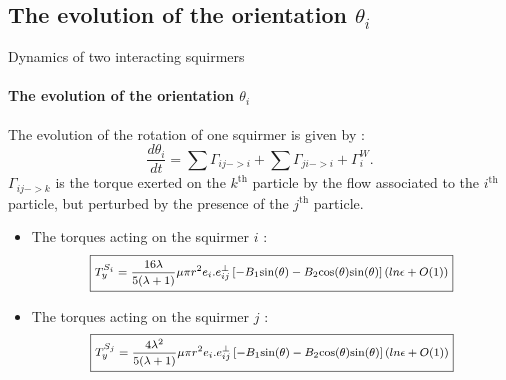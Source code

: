 \documentclass{beamer}
\begin{document}
\subsection{The evolution of the orientation $\theta _i$}
\begin{frame}{Dynamics of two interacting squirmers}
        \framesubtitle{The evolution of the orientation $\theta _i$}
    The evolution of the rotation of one squirmer is given by : 
    $$
    \frac{d \theta_i}{dt} = \sum \Gamma_{ij->i} + \sum \Gamma_{ji->i} +  \Gamma_{i}^W.
    $$ 
    $\Gamma_{ij->k}$ is the torque exerted on the $k^\mathrm{th}$ particle by the flow associated to the $i^\mathrm{th}$ particle, but perturbed by the presence of the $j^\mathrm{th}$ particle.
    
    \begin{itemize}
        \item The torques acting on the squirmer $i$ :
        \begin{equation*}
        \footnotesize
        \boxed{T_y^{S_i} = \frac{16 \lambda}{5(\lambda +1)} \mu \pi r^2 e_i.e^{\perp}_{ij}\left[-B_1\mathrm{sin}(\theta) -B_2\mathrm{cos}(\theta)\mathrm{sin}(\theta) \right] (ln \epsilon + O(1))}
    \end{equation*}
        \item The torques acting on the squirmer $j$ :
        \begin{equation*}
        \footnotesize
        \boxed{T_y^{S_j} = \frac{4 \lambda^2}{5(\lambda +1)} \mu \pi r^2 e_i.e^{\perp}_{ij}\left[-B_1\mathrm{sin}(\theta) -B_2\mathrm{cos}(\theta)\mathrm{sin}(\theta) \right] (ln \epsilon + O(1))}
    \end{equation*}
    \end{itemize}
        
\end{frame}
\end{document}
